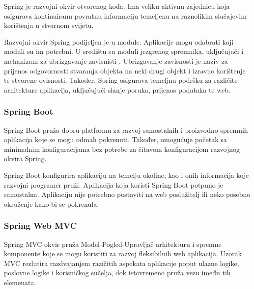 \documentclass[times, utf8, zavrsni, numeric]{fer}
\begin{document}
Spring je razvojni okvir otvorenog koda. Ima veliku aktivnu zajednicu koja osigurava kontinuiranu povratnu informaciju temeljenu na raznolikim slučajevim korištenja u stvarnom svijetu\cite{SpringFr9:online}.

Razvojni okvir Spring podijeljen je u module. Aplikacije mogu odabrati koji moduli su im potrebni. U središtu su moduli jezgrenog spremnika, uključujuči i mehanizam za ubrizgavanje zavisnisti . Ubrizgavanje zavisnosti je naziv za prijenos odgovornosti stvaranja objekta na neki drugi objekt i izravno korištenje te stvorene ovisnosti.  Također, Spring osigurava temeljnu podršku za različite arhitekture aplikacija, uključujući slanje poruka, prijenos podataka te web.
\subsubsection{Spring Boot}
Spring Boot pruža dobru platformu za razvoj samostalnih i proizvodno spremnih aplikacija koje se mogu odmah pokrenuti. Također, omogućuje početak sa minimalnim konfiguracijama bez potrebe za čitavom konfiguracijom razvojnog okvira Spring.

Spring Boot konfigurira aplikaciju na temelju okoline, kao i onih informacija koje razvojni programer pruži. Aplikacija koja koristi Spring Boot potpuno je samostalna. Aplikaciju nije potrebno postaviti na web poslužitelj ili neko posebno okruženje kako bi se pokrenula.
\subsubsection{Spring Web MVC}
Spring MVC  okvir pruža Model-Pogled-Upravljač arhitekturu i spremne komponente koje se mogu koristiti za razvoj fleksibilnih web aplikacija. Uzorak MVC rezlutira razdvajanjem razičitih aspekata aplikacije poput ulazne logike, poslovne logike i korisničkog sučelja, dok istovremeno pruža vezu imeđu tih elemenata.
\end{document}
